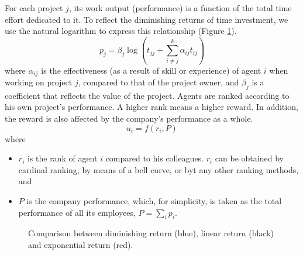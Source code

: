 \documentclass[10pt, a4paper]{article}
\begin{document}
	For each project $j$, its work output (performance) is a function of the total time effort dedicated to it. To reflect the diminishing returns of time investment, we use the natural logarithm to express this relationship (Figure \ref{fig:log}).
	\begin{equation}\label{eq:pj}
		p_j = \beta_j\log\left(t_{jj}+\sum_{i\neq j}^{k}\alpha_{ij}t_{ij}\right)
	\end{equation}
	where $\alpha_{ij}$ is the effectiveness (as a result of skill or experience) of agent $i$ when working on project $j$, compared to that of the project owner, and $\beta_{j}$ is a coefficient that reflects the value of the project. Agents are ranked according to his own project's performance. A higher rank means a higher reward. In addition, the reward is also affected by the company's performance as a whole.	
	\begin{equation}\label{eq:ui}
		u_i=f(r_i, P)
	\end{equation}
	where 
	\begin{itemize}
		\item $r_i$ is the rank of agent $i$ compared to his colleagues. $r_i$ can be obtained by cardinal ranking, by means of a bell curve, or byt any other ranking methods, and
		\item $P$ is the company performance, which, for simplicity, is taken as the total performance of all its employees, $P=\sum_{i}p_i$. 
	\end{itemize}
	\begin{figure}
		\centering
		\caption{Comparison between diminishing return (blue), linear return (black) and exponential return (red).}\label{fig:log}
	\end{figure}
\end{document}
